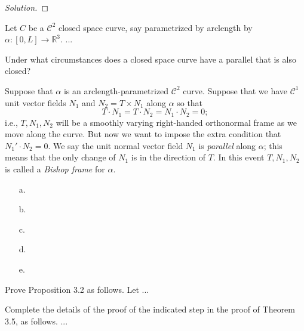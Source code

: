 \documentclass[Shifrin_Solutions_Spring_2015]{subfiles}
\begin{document}
\begin{proof}[Solution]




\end{proof}


\begin{exercise}
Let $C$ be a $\mathcal{C}^2$ closed space curve, say parametrized by arclength by $\alpha: [0,L] \rightarrow \mathbb{R}^3$. ...

\end{exercise}

\begin{exercise}
Under what circumstances does a closed space curve have a parallel that is also closed?
\end{exercise}

\begin{exercise}
Suppose that $\alpha$ is an arclength-parametrized $\mathcal{C}^2$ curve. Suppose that we have $\mathcal{C}^1$ unit vector fields $N_1$ and $N_2 = T\times N_1$ along $\alpha$ so that
\[
T\cdot N_1 = T\cdot N_2 = N_1 \cdot N_2 = 0 ;
\]
i.e., $T, N_1, N_2$ will be a smoothly varying right-handed orthonormal frame as we move along the curve. But now we want to impose the extra condition that $N_1'\cdot N_2 = 0$. We say the unit normal vector field $N_1$ is \emph{parallel} along $\alpha$; this means that the only change of $N_1$ is in the direction of $T$. In this event $T, N_1, N_2$ is called a \emph{Bishop frame} for $\alpha$.
\begin{itemize}
\item[a.]
\item[b.]
\item[c.]
\item[d.]
\item[e.]
\end{itemize}
\end{exercise}

\begin{exercise}
Prove Proposition 3.2 as follows. Let ...

\end{exercise}

\begin{exercise} Complete the details of the proof of the indicated step in the proof of Theorem 3.5, as follows. ...
\end{exercise}
\end{document}

